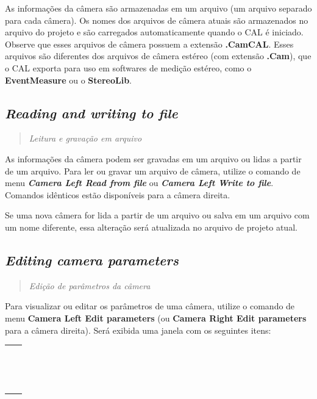 \documentclass[
  12pt,
  letterpaper,
  DIV=11,
  numbers=noendperiod]{scrreprt}
\begin{document}
As informações da câmera são armazenadas em um arquivo (um arquivo
separado para cada câmera). Os nomes dos arquivos de câmera atuais são
armazenados no arquivo do projeto e são carregados automaticamente
quando o CAL é iniciado. Observe que esses arquivos de câmera possuem a
extensão \textbf{.CamCAL}. Esses arquivos são diferentes dos arquivos de
câmera estéreo (com extensão \textbf{.Cam}), que o CAL exporta para uso
em softwares de medição estéreo, como o \textbf{EventMeasure} ou o
\textbf{StereoLib}.

\subsection{\texorpdfstring{\emph{Reading and writing to
file}}{Reading and writing to file}}\label{reading-and-writing-to-file-1}

\begin{quote}
\emph{Leitura e gravação em arquivo}
\end{quote}

As informações da câmera podem ser gravadas em um arquivo ou lidas a
partir de um arquivo. Para ler ou gravar um arquivo de câmera, utilize o
comando de menu \textbf{\emph{Camera \textbar{} Left \textbar{} Read
from file}} ou \textbf{\emph{Camera \textbar{} Left \textbar{} Write to
file}}. Comandos idênticos estão disponíveis para a câmera direita.

Se uma nova câmera for lida a partir de um arquivo ou salva em um
arquivo com um nome diferente, essa alteração será atualizada no arquivo
de projeto atual.

\subsection{\texorpdfstring{\emph{Editing camera
parameters}}{Editing camera parameters}}\label{editing-camera-parameters}

\begin{quote}
\emph{Edição de parâmetros da câmera}
\end{quote}

Para visualizar ou editar os parâmetros de uma câmera, utilize o comando
de menu \textbf{Camera \textbar{} Left \textbar{} Edit parameters} (ou
\textbf{Camera \textbar{} Right \textbar{} Edit parameters} para a
câmera direita). Será exibida uma janela com os seguintes itens:

\begin{longtable}[]{@{}ll@{}}
\toprule\noalign{}
\endhead
\bottomrule\noalign{}
\endlastfoot
& \\
& \\
& \\
& \\
& \\
& \\
& \\
& \\
& \\
& \\
& \\
& \\
& \\
& \\
& \\
\end{longtable}
\end{document}

